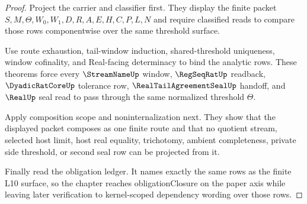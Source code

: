 \begin{proof}
Project the carrier and classifier first. They display the finite packet $S,M,\Theta,W_0,W_1,D,R,A,E,H,C,P,L,N$ and require classified reads to compare those rows componentwise over the same threshold surface.

Use route exhaustion, tail-window induction, shared-threshold uniqueness, window cofinality, and Real-facing determinacy to bind the analytic rows. These theorems force every $\StreamNameUp$ window, $\RegSeqRatUp$ readback, $\DyadicRatCoreUp$ tolerance row, $\RealTailAgreementSealUp$ handoff, and $\RealUp$ seal read to pass through the same normalized threshold $\Theta$.

Apply composition scope and noninternalization next. They show that the displayed packet composes as one finite route and that no quotient stream, selected host limit, host real equality, trichotomy, ambient completeness, private side threshold, or second seal row can be projected from it.

Finally read the obligation ledger. It names exactly the same rows as the finite L10 surface, so the chapter reaches obligationClosure on the paper axis while leaving later verification to kernel-scoped dependency wording over those rows.
\end{proof}

